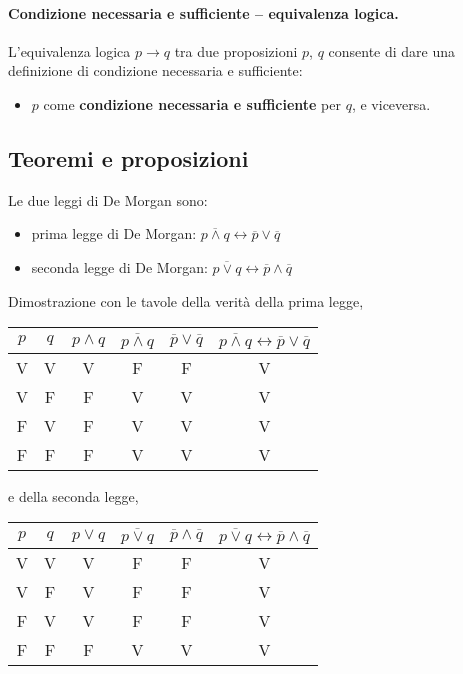 \paragraph{Condizione necessaria e sufficiente -- equivalenza logica.} L'equivalenza logica $p \rightarrow q$ tra due proposizioni $p$, $q$ consente di dare una definizione di condizione necessaria e sufficiente:
\begin{itemize}
    \item $p$ come \textbf{condizione necessaria e sufficiente} per $q$, e viceversa.
\end{itemize}

\subsection{Teoremi e proposizioni}
\begin{theorem} Le due leggi di De Morgan sono:
\begin{itemize}
    \item prima legge di De Morgan: $\overline{p \land q} \leftrightarrow \overline{p} \lor  \overline{q}$
    \item seconda legge di De Morgan: $\overline{p \lor  q} \leftrightarrow \overline{p} \land \overline{q}$
\end{itemize}
\end{theorem}
Dimostrazione con le tavole della verità della prima legge,
\begin{center}
\begin{tabular}{|c|c||c|c|c|c|}
  \hline
  $p$ & $q$ & $p \land q$ & $\overline{p \land q}$ & $\overline{p} \lor \overline{q}$ & $\overline{p \land q} \leftrightarrow \overline{p} \lor \overline{q}$\\
  \hline
  V & V & V & F & F & V \\
  V & F & F & V & V & V \\
  F & V & F & V & V & V \\
  F & F & F & V & V & V \\
  \hline
\end{tabular}
\end{center}
e della seconda legge,
\begin{center}
\begin{tabular}{|c|c||c|c|c|c|}
  \hline
  $p$ & $q$ & $p \lor q$ & $\overline{p \lor q}$ & $\overline{p} \land \overline{q}$ & $\overline{p \lor q} \leftrightarrow \overline{p} \land \overline{q}$\\
  \hline
  V & V & V & F & F & V \\
  V & F & V & F & F & V \\
  F & V & V & F & F & V \\
  F & F & F & V & V & V \\
  \hline
\end{tabular}
\end{center}


